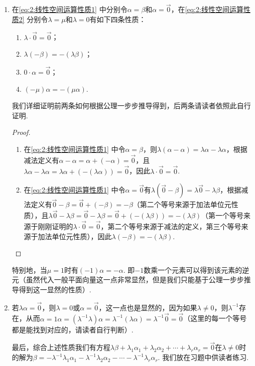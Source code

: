 \begin{enumerate}
\begin{enumerate}
              \item 在\autoref{eq:2:线性空间运算性质1} 中分别令$\alpha=\beta$和$\alpha=\vec{0}$，在\autoref{eq:2:线性空间运算性质2} 分别令$\lambda=\mu$和$\lambda=0$有如下四条性质：
                    \begin{enumerate}
                        \item $\lambda\cdot \vec{0}=\vec{0}$；

                        \item $\lambda(-\beta)=-(\lambda\beta)$；

                        \item $0\cdot \alpha=\vec{0}$；

                        \item $(-\mu)\alpha=-(\mu\alpha)$.
                    \end{enumerate}
                    我们详细证明前两条如何根据公理一步步推导得到，后两条请读者依照此自行证明.
                    \begin{proof}
                        \begin{enumerate}
                            \item 在\autoref{eq:2:线性空间运算性质1} 中令$\alpha=\beta$，则$\lambda(\alpha-\alpha)=\lambda\alpha-\lambda\alpha$，根据减法定义有$\alpha-\alpha=\alpha+(-\alpha)=\vec{0}$，且$\lambda\alpha-\lambda\alpha=\lambda\alpha+(-(\lambda\alpha))=\vec{0}$，因此$\lambda\cdot \vec{0}=\vec{0}$.

                            \item 在\autoref{eq:2:线性空间运算性质1} 中令$\alpha=\vec{0}$有$\lambda(\vec{0}-\beta)=\lambda\vec{0}-\lambda\beta$，根据减法定义有$\vec{0}-\beta=\vec{0}+(-\beta)=-\beta$（第二个等号来源于加法单位元性质），且$\lambda\vec{0}-\lambda\beta=\vec{0}-\lambda\beta=\vec{0}+(-(\lambda\beta))=-(\lambda\beta)$（第一个等号来源于刚刚证明的$\lambda\cdot \vec{0}=\vec{0}$，第二个等号来源于减法的定义，第三个等号来源于加法单位元性质），因此$\lambda(-\beta)=-(\lambda\beta)$.
                        \end{enumerate}
                    \end{proof}
                    特别地，当$\mu=1$时有$(-1)\alpha=-\alpha$. 即$-1$数乘一个元素可以得到该元素的逆元（虽然代入一般平面向量这一点非常显然，但是我们只能基于公理一步步推导得到这一显然的性质）.

              \item 若$\lambda\alpha=\vec{0}$，则$\lambda=0$或$\alpha=\vec{0}$，这一点也是显然的，因为如果$\lambda\neq 0$，则$\lambda^{-1}$存在，从而$\alpha=1\alpha=(\lambda^{-1}\lambda)\alpha=\lambda^{-1}(\lambda\alpha)=\lambda^{-1}\vec{0}=\vec{0}$（这里的每一个等号都是能找到对应的，请读者自行判断）.

                    最后，综合上述性质我们有方程$\lambda\beta+\lambda_1\alpha_1+\lambda_2\alpha_2+\cdots+\lambda_r\alpha_r=\vec{0}$在$\lambda\neq 0$时的解为$\beta=-\lambda^{-1}\lambda_1\alpha_1-\lambda^{-1}\lambda_2\alpha_2-\cdots-\lambda^{-1}\lambda_r\alpha_r$. 我们放在习题中供读者练习.
          \end{enumerate}
\end{enumerate}

